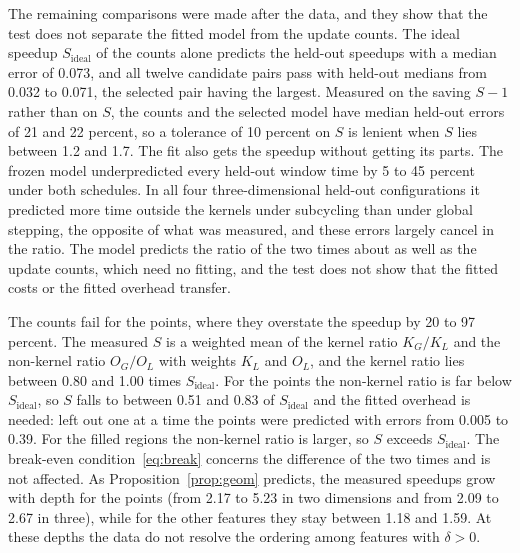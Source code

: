 \documentclass[12pt]{article}
\theoremstyle{remark}
\newcommand{\Sid}{S_{\mathrm{ideal}}}
\begin{document}
The remaining comparisons were made after the data, and they show that the test does not separate the fitted model from the update counts. The ideal speedup $\Sid$ of the counts alone predicts the held-out speedups with a median error of 0.073, and all twelve candidate pairs pass with held-out medians from 0.032 to 0.071, the selected pair having the largest. Measured on the saving $S-1$ rather than on $S$, the counts and the selected model have median held-out errors of 21 and 22 percent, so a tolerance of 10 percent on $S$ is lenient when $S$ lies between 1.2 and 1.7. The fit also gets the speedup without getting its parts. The frozen model underpredicted every held-out window time by 5 to 45 percent under both schedules. In all four three-dimensional held-out configurations it predicted more time outside the kernels under subcycling than under global stepping, the opposite of what was measured, and these errors largely cancel in the ratio. The model predicts the ratio of the two times about as well as the update counts, which need no fitting, and the test does not show that the fitted costs or the fitted overhead transfer.

The counts fail for the points, where they overstate the speedup by 20 to 97 percent. The measured $S$ is a weighted mean of the kernel ratio $K_G/K_L$ and the non-kernel ratio $O_G/O_L$ with weights $K_L$ and $O_L$, and the kernel ratio lies between 0.80 and 1.00 times $\Sid$. For the points the non-kernel ratio is far below $\Sid$, so $S$ falls to between 0.51 and 0.83 of $\Sid$ and the fitted overhead is needed: left out one at a time the points were predicted with errors from 0.005 to 0.39. For the filled regions the non-kernel ratio is larger, so $S$ exceeds $\Sid$. The break-even condition~\eqref{eq:break} concerns the difference of the two times and is not affected. As Proposition~\ref{prop:geom} predicts, the measured speedups grow with depth for the points (from 2.17 to 5.23 in two dimensions and from 2.09 to 2.67 in three), while for the other features they stay between 1.18 and 1.59. At these depths the data do not resolve the ordering among features with $\delta>0$.
\end{document}
